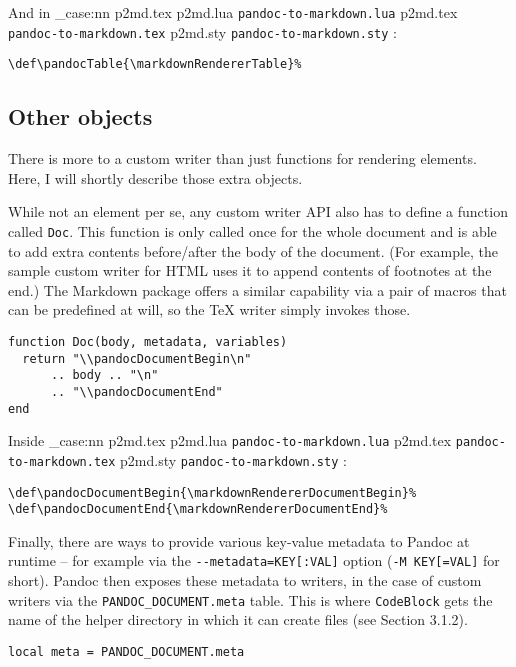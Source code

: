 \documentclass[
  digital,     %
  oneside,     %
  nosansbold,  %
  nocolorbold, %
  lof,         %
  nolot,       %
]{fithesis4}
\newcommand\file[1]
  {
    \str_case:nn
      { #1 }
      {
        { p2md.lua } { \texttt{pandoc\hyp{}to\hyp{}markdown.lua} }
        { p2md.tex } { \texttt{pandoc\hyp{}to\hyp{}markdown.tex} }
        { p2md.sty } { \texttt{pandoc\hyp{}to\hyp{}markdown.sty} }
      }
  }
\begin{document}
\noindent
And in \file{p2md.tex}:

\noindent
\lstset{language=[plain]TeX}
\begin{lstlisting}
\def\pandocTable{\markdownRendererTable}%
\end{lstlisting}

\subsection{Other objects}
There is more to a custom writer than just functions for rendering elements. Here, I will shortly describe those extra objects.

While not an element per se, any custom writer API also has to define a function called \texttt{Doc}. This function is only called once for the whole document and is able to add extra contents before/after the body of the document. (For example, the sample custom writer for HTML uses it to append contents of footnotes at the end.) The Markdown package offers a similar capability via a pair of macros that can be predefined at will, so the \TeX{} writer simply invokes those.

\noindent
\lstset{language=[5.3]Lua}
\begin{lstlisting}
function Doc(body, metadata, variables)
  return "\\pandocDocumentBegin\n"
      .. body .. "\n"
      .. "\\pandocDocumentEnd"
end
\end{lstlisting}

\noindent
Inside \file{p2md.tex}:

\noindent
\lstset{language=[plain]TeX}
\begin{lstlisting}
\def\pandocDocumentBegin{\markdownRendererDocumentBegin}%
\def\pandocDocumentEnd{\markdownRendererDocumentEnd}%
\end{lstlisting}

\noindent
Finally, there are ways to provide various key-value metadata to Pandoc at runtime -- for example via the \texttt{-{}-metadata=KEY[:VAL]} option (\texttt{-M KEY[=VAL]} for short). Pandoc then exposes these metadata to writers, in the case of custom writers via the \texttt{PANDOC\_DOCUMENT.meta} table. This is where \texttt{CodeBlock} gets the name of the helper directory in which it can create files (see Section 3.1.2).

\noindent
\lstset{language=[5.3]Lua}
\begin{lstlisting}
local meta = PANDOC_DOCUMENT.meta
\end{lstlisting}
\end{document}
